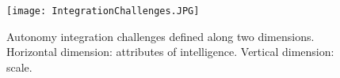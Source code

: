 

\begin{figure}
\centering
\texttt{[image: IntegrationChallenges.JPG]}
\caption{Autonomy integration challenges defined along two dimensions. Horizontal dimension: attributes of intelligence. Vertical dimension: scale.}
\label{challenges}
\end{figure}


